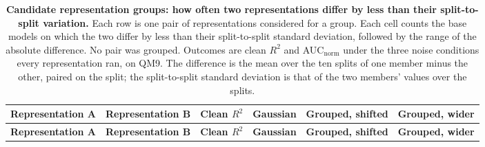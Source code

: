 
{\scriptsize
\begin{longtable}{llcccc}
\caption{\textbf{\SuppFile{} Candidate representation groups: how often two representations differ by less than their split-to-split variation.}
Each row is one pair of representations considered for a group. Each cell counts the base models on which the two differ by less than their split-to-split standard deviation, followed by the range of the absolute difference. No pair was grouped. Outcomes are clean $R^2$ and AUC$_\mathrm{norm}$ under the three noise conditions every representation ran, on QM9. The difference is the mean over the ten splits of one member minus the other, paired on the split; the split-to-split standard deviation is that of the two members' values over the splits.}
\label{supp:family_pairs_representations}\\
\toprule
\textbf{Representation A} & \textbf{Representation B} & \textbf{Clean $R^2$} & \textbf{Gaussian} & \textbf{Grouped, shifted} & \textbf{Grouped, wider} \\
\midrule
\endfirsthead
\toprule
\textbf{Representation A} & \textbf{Representation B} & \textbf{Clean $R^2$} & \textbf{Gaussian} & \textbf{Grouped, shifted} & \textbf{Grouped, wider} \\
\midrule
\endhead

\bottomrule
\end{longtable}}
